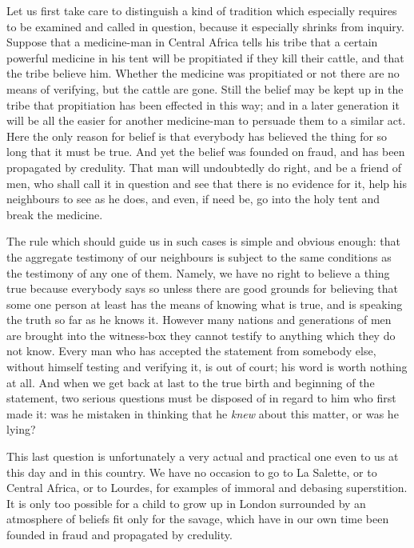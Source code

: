 \documentclass[12pt]{article}
\begin{document}
Let us first take care to distinguish a kind of tradition which especially requires to be examined and called in question, because it especially shrinks from inquiry. Suppose that a medicine-man in Central Africa tells his tribe that a certain powerful medicine in his tent will be propitiated if they kill their cattle, and that the tribe believe him. Whether the medicine was propitiated or not there are no means of verifying, but the cattle are gone. Still the belief may be kept up in the tribe that propitiation has been effected in this way; and in a later generation it will be all the easier for another medicine-man to persuade them to a similar act. Here the only reason for belief is that everybody has believed the thing for so long that it must be true. And yet the belief was founded on fraud, and has been propagated by credulity. That man will undoubtedly do right, and be a friend of men, who shall call it in question and see that there is no evidence for it, help his neighbours to see as he does, and even, if need be, go into the holy tent and break the medicine.

The rule which should guide us in such cases is simple and obvious enough: that the aggregate testimony of our neighbours is subject to the same conditions as the testimony of any one of them. Namely, we have no right to believe a thing true because everybody says so unless there are good grounds for believing that some one person at least has the means of knowing what is true, and is speaking the truth so far as he knows it. However many nations and generations of men are brought into the witness-box they cannot testify to anything which they do not know. Every man who has accepted the statement from somebody else, without himself testing and verifying it, is out of court; his word is worth nothing at all. And when we get back at last to the true birth and beginning of the statement, two serious questions must be disposed of in regard to him who first made it: was he mistaken in thinking that he \emph{knew} about this matter, or was he lying?

This last question is unfortunately a very actual and practical one even to us at this day and in this country. We have no occasion to go to La Salette, or to Central Africa, or to Lourdes, for examples of immoral and debasing superstition. It is only too possible for a child to grow up in London surrounded by an atmosphere of beliefs fit only for the savage, which have in our own time been founded in fraud and propagated by credulity.
\end{document}
